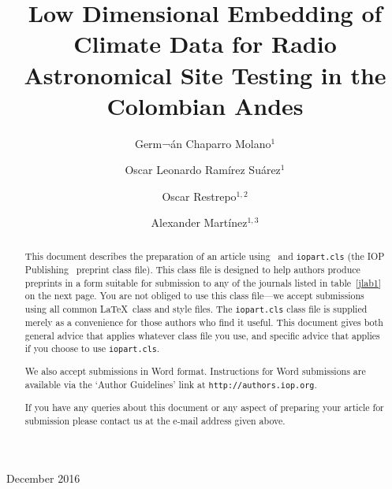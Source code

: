 \documentclass[12pt]{iopart}
\begin{document}

\title[Low Dimensional Embedding of Climate Data for Radio Astronomical Site Testing]{Low Dimensional Embedding of Climate Data for Radio Astronomical Site Testing in the Colombian Andes}

\author{Germ¬\'an Chaparro Molano$^{1}$}
\address{$^1$Grupo de Simulaci\'on, An\'alisis y Modelado, Vicerrector\'ia de Investigaci\'on, Universidad ECCI, Bogot\'a, Colombia}
\author{Oscar Leonardo Ram\'irez Su\'arez$^{1}$}
\address{$^1$Grupo de Simulaci\'on, An\'alisis y Modelado, Vicerrector\'ia de Investigaci\'on, Universidad ECCI, Bogot\'a, Colombia}
\author{Oscar Restrepo$^{1,2}$}
\address{$^1$Grupo de Simulaci\'on, An\'alisis y Modelado, Vicerrector\'ia de Investigaci\'on, Universidad ECCI, Bogot\'a, Colombia}
\address{$^2$Radio Astronomy Instrumentation Group, Universidad de Chile, Santiago de Chile, Chile}
\author{Alexander Mart\'inez$^{1,3}$}
\address{$^1$Grupo de Simulaci\'on, An\'alisis y Modelado, Vicerrector\'ia de Investigaci\'on, Universidad ECCI, Bogot\'a, Colombia}
\address{$^3$Instituto de Hidrolog\'ia, Meteorolog\'ia y Estudios Ambientales, Bogot\'a, Colombia}
\vspace{10pt}
\begin{indented}
\item[]December 2016
\end{indented}

\begin{abstract}
This document describes the  preparation of an article using \LaTeXe\ and 
\verb"iopart.cls" (the IOP Publishing \LaTeXe\ preprint class file).
This class file is designed to help 
authors produce preprints in a form suitable for submission to any of the
journals listed in table~\ref{jlab1} on the next page.  You are not obliged to use this class file---we accept
submissions using all common \LaTeX\ class and style files.  The \verb"iopart.cls"
class file is supplied merely as a convenience for those authors who find it useful.
This document gives both general advice that applies whatever class file you use, and specific advice
that applies if you choose to use \verb"iopart.cls".

We also accept submissions in Word format.  Instructions for Word submissions are available via the `Author Guidelines' link at \verb"http://authors.iop.org".

If you have any queries about this document or any aspect of preparing your article for submission please contact us at the e-mail address given above.
\end{abstract}
\end{document}
